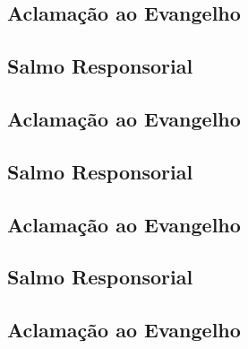 \subsection{Aclamação ao Evangelho}\label{subsection:natal/sagrada-família/aclamacao}

\label{section:natal/santa-maria-mae-de-deus}

\subsection{Salmo Responsorial}\label{subsection:natal/santa-maria-mae-de-deus/salmo-responsorial}

\subsection{Aclamação ao Evangelho}\label{subsection:natal/santa-maria-mae-de-deus/aclamacao}

\label{section:natal/epifania}

\subsection{Salmo Responsorial}\label{subsection:natal/epifania/salmo-responsorial}

\subsection{Aclamação ao Evangelho}\label{subsection:natal/epifania/aclamacao}

\label{section:natal/batismo}

\subsection{Salmo Responsorial}\label{subsection:natal/batismo/salmo-responsorial}

\subsection{Aclamação ao Evangelho}\label{subsection:natal/batismo/aclamacao}